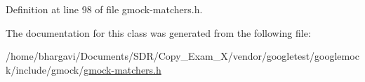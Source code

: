 Definition at line 98 of file gmock-\/matchers.\+h.



The documentation for this class was generated from the following file\+:\begin{DoxyCompactItemize}
\item 
/home/bhargavi/\+Documents/\+S\+D\+R/\+Copy\+\_\+\+Exam\+\_\+X/vendor/googletest/googlemock/include/gmock/\hyperlink{gmock-matchers_8h}{gmock-\/matchers.\+h}\end{DoxyCompactItemize}
